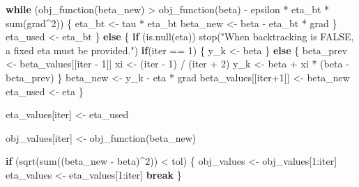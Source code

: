 \documentclass[
  letterpaper,
  DIV=11,
  numbers=noendperiod]{scrartcl}
\newenvironment{Shaded}{\begin{snugshade}}{\end{snugshade}}
\newcommand{\ControlFlowTok}[1]{\textcolor[rgb]{0.00,0.23,0.31}{\textbf{#1}}}
\newcommand{\DecValTok}[1]{\textcolor[rgb]{0.68,0.00,0.00}{#1}}
\newcommand{\FunctionTok}[1]{\textcolor[rgb]{0.28,0.35,0.67}{#1}}
\newcommand{\NormalTok}[1]{\textcolor[rgb]{0.00,0.23,0.31}{#1}}
\newcommand{\OtherTok}[1]{\textcolor[rgb]{0.00,0.23,0.31}{#1}}
\newcommand{\SpecialCharTok}[1]{\textcolor[rgb]{0.37,0.37,0.37}{#1}}
\newcommand{\StringTok}[1]{\textcolor[rgb]{0.13,0.47,0.30}{#1}}
\begin{document}
\begin{Shaded}
\begin{Highlighting}[]
      \ControlFlowTok{while}\NormalTok{ (}\FunctionTok{obj\_function}\NormalTok{(beta\_new) }\SpecialCharTok{\textgreater{}} \FunctionTok{obj\_function}\NormalTok{(beta) }\SpecialCharTok{{-}}\NormalTok{ epsilon }\SpecialCharTok{*}\NormalTok{ eta\_bt }\SpecialCharTok{*} \FunctionTok{sum}\NormalTok{(grad}\SpecialCharTok{\^{}}\DecValTok{2}\NormalTok{)) \{}
\NormalTok{        eta\_bt }\OtherTok{\textless{}{-}}\NormalTok{ tau }\SpecialCharTok{*}\NormalTok{ eta\_bt}
\NormalTok{        beta\_new }\OtherTok{\textless{}{-}}\NormalTok{ beta }\SpecialCharTok{{-}}\NormalTok{ eta\_bt }\SpecialCharTok{*}\NormalTok{ grad}
\NormalTok{      \}}
\NormalTok{      eta\_used }\OtherTok{\textless{}{-}}\NormalTok{ eta\_bt}
\NormalTok{    \} }\ControlFlowTok{else}\NormalTok{ \{}
      \ControlFlowTok{if}\NormalTok{ (}\FunctionTok{is.null}\NormalTok{(eta)) }\FunctionTok{stop}\NormalTok{(}\StringTok{"When backtracking is FALSE, a fixed eta must be provided."}\NormalTok{)}
      \ControlFlowTok{if}\NormalTok{(iter }\SpecialCharTok{==} \DecValTok{1}\NormalTok{) \{}
\NormalTok{        y\_k }\OtherTok{\textless{}{-}}\NormalTok{ beta}
\NormalTok{      \} }\ControlFlowTok{else}\NormalTok{ \{}
\NormalTok{        beta\_prev }\OtherTok{\textless{}{-}}\NormalTok{ beta\_values[[iter }\SpecialCharTok{{-}} \DecValTok{1}\NormalTok{]]}
\NormalTok{        xi }\OtherTok{\textless{}{-}}\NormalTok{ (iter }\SpecialCharTok{{-}} \DecValTok{1}\NormalTok{) }\SpecialCharTok{/}\NormalTok{ (iter }\SpecialCharTok{+} \DecValTok{2}\NormalTok{)}
\NormalTok{        y\_k }\OtherTok{\textless{}{-}}\NormalTok{ beta }\SpecialCharTok{+}\NormalTok{ xi }\SpecialCharTok{*}\NormalTok{ (beta }\SpecialCharTok{{-}}\NormalTok{ beta\_prev)}
\NormalTok{      \}}
\NormalTok{      beta\_new }\OtherTok{\textless{}{-}}\NormalTok{ y\_k }\SpecialCharTok{{-}}\NormalTok{ eta }\SpecialCharTok{*}\NormalTok{ grad}
\NormalTok{      beta\_values[[iter}\SpecialCharTok{+}\DecValTok{1}\NormalTok{]] }\OtherTok{\textless{}{-}}\NormalTok{ beta\_new}
\NormalTok{      eta\_used }\OtherTok{\textless{}{-}}\NormalTok{ eta}
\NormalTok{    \}}
    
\NormalTok{    eta\_values[iter] }\OtherTok{\textless{}{-}}\NormalTok{ eta\_used}
    
\NormalTok{    obj\_values[iter] }\OtherTok{\textless{}{-}} \FunctionTok{obj\_function}\NormalTok{(beta\_new)}
    
    \ControlFlowTok{if}\NormalTok{ (}\FunctionTok{sqrt}\NormalTok{(}\FunctionTok{sum}\NormalTok{((beta\_new }\SpecialCharTok{{-}}\NormalTok{ beta)}\SpecialCharTok{\^{}}\DecValTok{2}\NormalTok{)) }\SpecialCharTok{\textless{}}\NormalTok{ tol) \{}
\NormalTok{      obj\_values }\OtherTok{\textless{}{-}}\NormalTok{ obj\_values[}\DecValTok{1}\SpecialCharTok{:}\NormalTok{iter]}
\NormalTok{      eta\_values }\OtherTok{\textless{}{-}}\NormalTok{ eta\_values[}\DecValTok{1}\SpecialCharTok{:}\NormalTok{iter]}
      \ControlFlowTok{break}
\NormalTok{    \}}
    

\end{Highlighting}
\end{Shaded}
\end{document}
